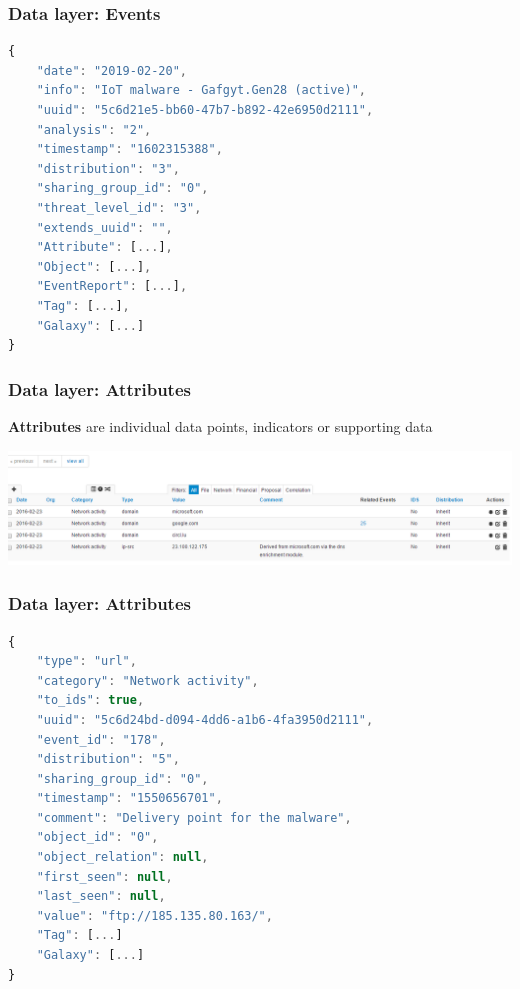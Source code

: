 \begin{frame}[fragile]
    \frametitle{Data layer: Events}
        \begin{lstlisting}[language=javascript,firstnumber=1]
{
    "date": "2019-02-20",
    "info": "IoT malware - Gafgyt.Gen28 (active)",
    "uuid": "5c6d21e5-bb60-47b7-b892-42e6950d2111",
    "analysis": "2",
    "timestamp": "1602315388",
    "distribution": "3",
    "sharing_group_id": "0",
    "threat_level_id": "3",
    "extends_uuid": "",
    "Attribute": [...],
    "Object": [...],
    "EventReport": [...],
    "Tag": [...],
    "Galaxy": [...]
}
\end{lstlisting}
\end{frame}

\begin{frame}[fragile]
    \frametitle{Data layer: Attributes}
        {\bf Attributes} are individual data points, indicators or supporting data
        \begin{center}
            \includegraphics[width=1.0\linewidth]{screenshots/enrichment4.png}
        \end{center}
\end{frame}

\begin{frame}[fragile]
    \frametitle{Data layer: Attributes}
        \begin{lstlisting}[language=javascript,firstnumber=1]
{
    "type": "url",
    "category": "Network activity",
    "to_ids": true,
    "uuid": "5c6d24bd-d094-4dd6-a1b6-4fa3950d2111",
    "event_id": "178",
    "distribution": "5",
    "sharing_group_id": "0",
    "timestamp": "1550656701",
    "comment": "Delivery point for the malware",
    "object_id": "0",
    "object_relation": null,
    "first_seen": null,
    "last_seen": null,
    "value": "ftp://185.135.80.163/",
    "Tag": [...]
    "Galaxy": [...]
}
\end{lstlisting}
\end{frame}

